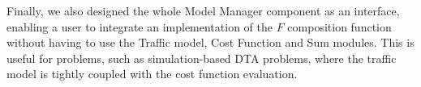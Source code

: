 Finally, we also designed the whole Model Manager component as an interface, enabling a user to integrate an implementation of the $F$ composition function without having to use the Traffic model, Cost Function and Sum modules. This is useful for problems, such as simulation-based DTA problems, where the traffic model is tightly coupled with the cost function evaluation.